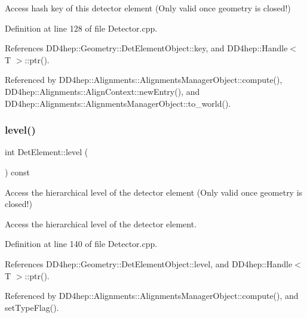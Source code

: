 Access hash key of this detector element (Only valid once geometry is closed!) 



Definition at line 128 of file Detector.\+cpp.



References D\+D4hep\+::\+Geometry\+::\+Det\+Element\+Object\+::key, and D\+D4hep\+::\+Handle$<$ T $>$\+::ptr().



Referenced by D\+D4hep\+::\+Alignments\+::\+Alignments\+Manager\+Object\+::compute(), D\+D4hep\+::\+Alignments\+::\+Align\+Context\+::new\+Entry(), and D\+D4hep\+::\+Alignments\+::\+Alignments\+Manager\+Object\+::to\+\_\+world().

\hypertarget{class_d_d4hep_1_1_geometry_1_1_det_element_af80cc6972c24efbcabbfc856e0b472a9}{}\label{class_d_d4hep_1_1_geometry_1_1_det_element_af80cc6972c24efbcabbfc856e0b472a9} 
\subsubsection{\texorpdfstring{level()}{level()}}
{\footnotesize\ttfamily int Det\+Element\+::level (\begin{DoxyParamCaption}{ }\end{DoxyParamCaption}) const}



Access the hierarchical level of the detector element (Only valid once geometry is closed!) 

Access the hierarchical level of the detector element. 

Definition at line 140 of file Detector.\+cpp.



References D\+D4hep\+::\+Geometry\+::\+Det\+Element\+Object\+::level, and D\+D4hep\+::\+Handle$<$ T $>$\+::ptr().



Referenced by D\+D4hep\+::\+Alignments\+::\+Alignments\+Manager\+Object\+::compute(), and set\+Type\+Flag().

\hypertarget{class_d_d4hep_1_1_geometry_1_1_det_element_a4e1874622d6fb893541a8580e6056873}{}\label{class_d_d4hep_1_1_geometry_1_1_det_element_a4e1874622d6fb893541a8580e6056873} 
